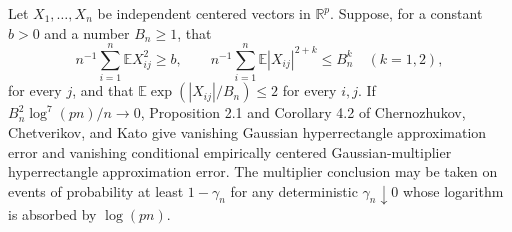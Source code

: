 Let \(X_1,\ldots,X_n\) be independent centered vectors in \(\mathbb R^p\).  Suppose, for a constant \(b>0\) and a number \(B_n\geq1\), that
\[
 n^{-1}\sum_{i=1}^n\mathbb E X_{ij}^2\geq b,
 \qquad
 n^{-1}\sum_{i=1}^n\mathbb E|X_{ij}|^{2+k}\leq B_n^k
 \quad(k=1,2),
\]
for every \(j\), and that \(\mathbb E\exp(|X_{ij}|/B_n)\leq2\) for every \(i,j\).  If \(B_n^2\log^7(pn)/n\to0\), Proposition 2.1 and Corollary 4.2 of Chernozhukov, Chetverikov, and Kato give vanishing Gaussian hyperrectangle approximation error and vanishing conditional empirically centered Gaussian-multiplier hyperrectangle approximation error.  The multiplier conclusion may be taken on events of probability at least \(1-\gamma_n\) for any deterministic \(\gamma_n\downarrow0\) whose logarithm is absorbed by \(\log(pn)\).